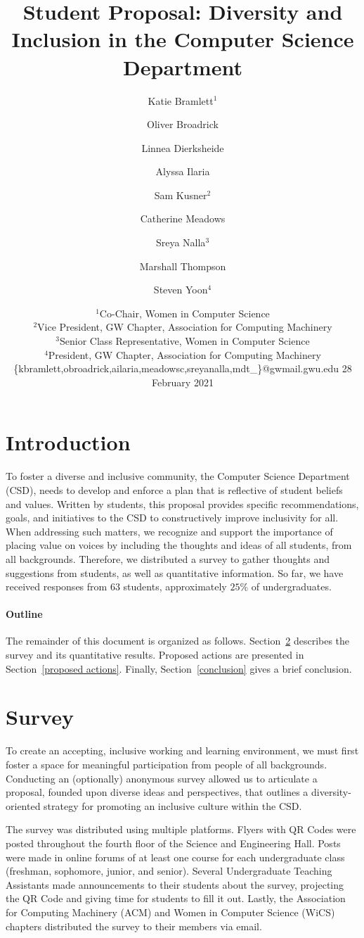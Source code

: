 \documentclass{article}
\title{Student Proposal: Diversity and Inclusion in the Computer Science Department}
\author{
Katie Bramlett$^1$\and
Oliver Broadrick\and
Linnea Dierksheide\and
Alyssa Ilaria\and
Sam Kusner$^2$\and
Catherine Meadows\and
Sreya Nalla$^3$\and
Marshall Thompson\and
Steven Yoon$^4$
}
\date{%
    $^1$Co-Chair, Women in Computer Science\\
    $^2$Vice President, GW Chapter, Association for Computing Machinery\\
    $^3$Senior Class Representative, Women in Computer Science\\
    $^4$President, GW Chapter, Association for Computing Machinery\\
    \{kbramlett,obroadrick,ailaria,meadowsc,sreyanalla,mdt\_\}@gwmail.gwu.edu
    28 February 2021
}
\begin{document}
\maketitle


\section{Introduction}
To foster a diverse and inclusive community, the Computer Science Department (CSD), 
needs to develop and enforce a plan that is reflective of student beliefs and values.
Written by students, this proposal
provides specific recommendations, goals, and initiatives
to the CSD to constructively improve
inclusivity for all.
When addressing such matters, we recognize and support the importance of 
placing value on voices by including the thoughts and ideas of all students, from all backgrounds.
Therefore, we distributed a survey to gather thoughts and suggestions from students, as well as 
quantitative information. So far, we have
received responses from $63$ students, approximately $25\%$ of undergraduates.

\paragraph{Outline}
The remainder of this document is organized as follows.
Section~\ref{survey} describes the survey and its quantitative results.
Proposed actions are presented in Section~\ref{proposed actions}.
Finally, Section~\ref{conclusion} gives a brief conclusion.

\section{Survey}\label{survey}
To create an accepting, inclusive working and learning environment, we must 
first foster a space for meaningful participation from people of all backgrounds.
Conducting an (optionally) anonymous survey allowed us to articulate a proposal, 
founded upon diverse ideas and perspectives, that outlines a diversity-oriented
strategy for promoting an inclusive culture within the CSD.

The survey was distributed using multiple platforms. Flyers with QR Codes were posted
throughout the fourth floor of the Science and Engineering Hall.
Posts were made in online forums of at least one course
for each undergraduate class (freshman, sophomore, junior, and senior).
Several Undergraduate Teaching Assistants made announcements to their 
students about the survey, projecting the QR Code and giving time
for students to fill it out. Lastly, the Association for Computing Machinery (ACM) and Women 
in Computer Science (WiCS) chapters distributed the survey to their members via email. 
\end{document}
